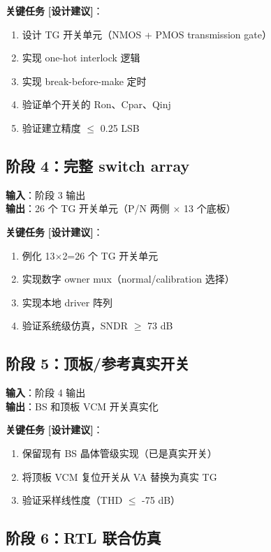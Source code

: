 \documentclass[UTF8,a4paper,11pt]{ctexart}
\newcommand{\suggested}{\textcolor{suggestblue}{\textbf{[设计建议]}}}
\begin{document}
\textbf{关键任务} \suggested：
\begin{enumerate}[leftmargin=2em]
\item 设计 TG 开关单元（NMOS + PMOS transmission gate）
\item 实现 one-hot interlock 逻辑
\item 实现 break-before-make 定时
\item 验证单个开关的 Ron、Cpar、Qinj
\item 验证建立精度 $\leq$ 0.25 LSB
\end{enumerate}

\subsection{阶段 4：完整 switch array}

\textbf{输入}：阶段 3 输出\\
\textbf{输出}：26 个 TG 开关单元（P/N 两侧 $\times$ 13 个底板）

\textbf{关键任务} \suggested：
\begin{enumerate}[leftmargin=2em]
\item 例化 13$\times$2=26 个 TG 开关单元
\item 实现数字 owner mux（normal/calibration 选择）
\item 实现本地 driver 阵列
\item 验证系统级仿真，SNDR $\geq$ 73 dB
\end{enumerate}

\subsection{阶段 5：顶板/参考真实开关}

\textbf{输入}：阶段 4 输出\\
\textbf{输出}：BS 和顶板 VCM 开关真实化

\textbf{关键任务} \suggested：
\begin{enumerate}[leftmargin=2em]
\item 保留现有 BS 晶体管级实现（已是真实开关）
\item 将顶板 VCM 复位开关从 VA 替换为真实 TG
\item 验证采样线性度（THD $\leq$ -75 dB）
\end{enumerate}

\subsection{阶段 6：RTL 联合仿真}
\end{document}
